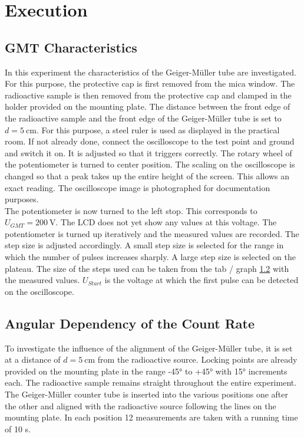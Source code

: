 \chapter{Execution}
\section{GMT Characteristics}
In this experiment the characteristics of the Geiger-Müller tube are investigated. For this purpose, the protective cap is first removed from the mica window. The radioactive sample is then removed from the protective cap and clamped in the holder provided on the mounting plate. The distance between the front edge of the radioactive sample and the front edge of the Geiger-Müller tube is set to $d = 5\ \mathrm{cm}$. For this purpose, a steel ruler is used as displayed in the practical room. If not already done, connect the oscilloscope to the test point and ground and switch it on. It is adjusted so that it triggers correctly. The rotary wheel of the potentiometer is turned to center position. The scaling on the oscilloscope is changed so that a peak takes up the entire height of the screen. This allows an exact reading. The oscilloscope image is photographed for documentation purposes.\\
The potentiometer is now turned to the left stop. This corresponds to $U_{GMT} = 200\ \mathrm{V}$. The LCD does not yet show any values at this voltage. The potentiometer is turned up iteratively and the measured values are recorded. The step size is adjusted accordingly. A small step size is selected for the range in which the number of pulses increases sharply. A large step size is selected on the plateau. The size of the steps used can be taken from the tab / graph \ref{} with the measured values. $U_{Start}$ is the voltage at which the first pulse can be detected on the oscilloscope.
%
\section{Angular Dependency of the Count Rate}
To investigate the influence of the alignment of the Geiger-Müller tube, it is set at a distance of $d = 5\ \mathrm{cm}$ from the radioactive source. Locking points are already provided on the mounting plate in the range -45° to +45° with 15° increments each. The radioactive sample remains straight throughout the entire experiment. The Geiger-Müller counter tube is inserted into the various positions one after the other and aligned with the radioactive source following the lines on the mounting plate. In each position 12 measurements are taken with a running time of 10 s. 
%
